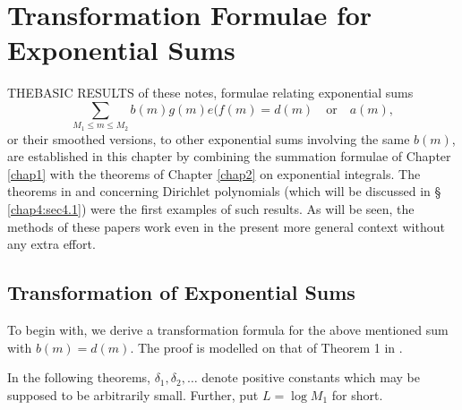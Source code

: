 
\chapter{Transformation Formulae for Exponential Sums}\label{chap3}

THE\pageoriginale BASIC RESULTS of these notes, formulae relating
exponential sums
$$
\sum\limits_{M_1\leq m\leq M_2}b(m)g(m)e(f(m)=d(m)\quad\text{or}\quad
a(m),
$$
or their smoothed versions, to other exponential sums involving the
same $b(m)$, are established in this chapter by combining the
summation formulae of Chapter \ref{chap1} with the theorems of
Chapter \ref{chap2} on exponential integrals. The theorems in
\cite{key16} and \cite{key17} concerning Dirichlet polynomials (which
will be discussed in \S~ \ref{chap4:sec4.1}) were the first examples
of such results. As will be seen, the methods of these papers work
even in the present more general context without any extra effort.

\section{Transformation of Exponential Sums}\label{chap3:sec3.1} 

To begin with, we derive a transformation formula for the above
mentioned sum with $b(m)=d(m)$. The proof is modelled on that of
Theorem 1 in \cite{key16}.

In the following theorems, $\delta_1, \delta_2,\ldots$ denote positive
constants which may be supposed to be arbitrarily small. Further, put
$L=\log M_1$ for short.


